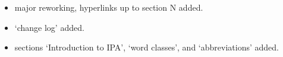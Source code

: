 \begin{footnotesize}
\begin{itemize}
\item[2016-07-04] major reworking, hyperlinks up to section N added. %





\item[2015-10-29] `change log' added. %



\item[2015-08-06] sections `Introduction to IPA', `word classes', and `abbreviations' added.


\end{itemize}
\end{footnotesize}
